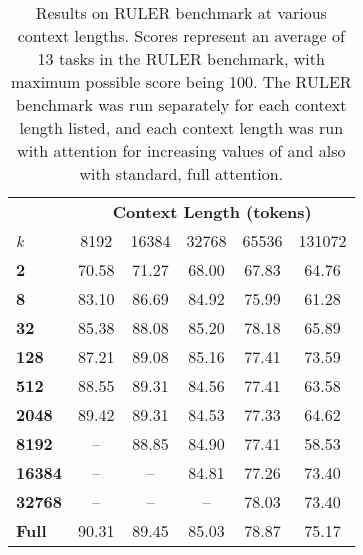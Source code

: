 \begin{table}[b!]
\centering
\caption{Results on RULER benchmark at various context lengths. Scores represent an average of 13 tasks in the RULER benchmark, with maximum possible score being 100. The RULER benchmark was run separately for each context length listed, and each context length was run with \topk attention for increasing values of \kk and also with standard, full attention.}\label{tab:ruler_raw_results}
\begin{tabular}{l|ccccc}
\toprule
& \multicolumn{5}{c}{\textbf{Context Length (tokens)}} \\ 
\textit{k}              & {8192} & {16384} & {32768} & {65536} & {131072} \\
\midrule
\textbf{2}              & 70.58                & 71.27                 & 68.00                 & 67.83                 & 64.76                  \\
\textbf{8}              & 83.10                & 86.69                 & 84.92                 & 75.99                 & 61.28                  \\
\textbf{32}             & 85.38                & 88.08                 & 85.20                 & 78.18                 & 65.89                  \\
\textbf{128}            & 87.21                & 89.08                 & 85.16                 & 77.41                 & 73.59                  \\
\textbf{512}            & 88.55                & 89.31                 & 84.56                 & 77.41                 & 63.58                  \\
\textbf{2048}           & 89.42                & 89.31                 & 84.53                 & 77.33                 & 64.62                  \\
\textbf{8192}           & --                   & 88.85                 & 84.90                 & 77.41                 & 58.53                  \\
\textbf{16384}          & --                   & --                    & 84.81                 & 77.26                 & 73.40                  \\
\textbf{32768}          & --                   & --                    & --                    & 78.03                 & 73.40                  \\
\textbf{Full}           & 90.31                & 89.45                 & 85.03                 & 78.87                 & 75.17  \\ \bottomrule            
\end{tabular}
\end{table}

